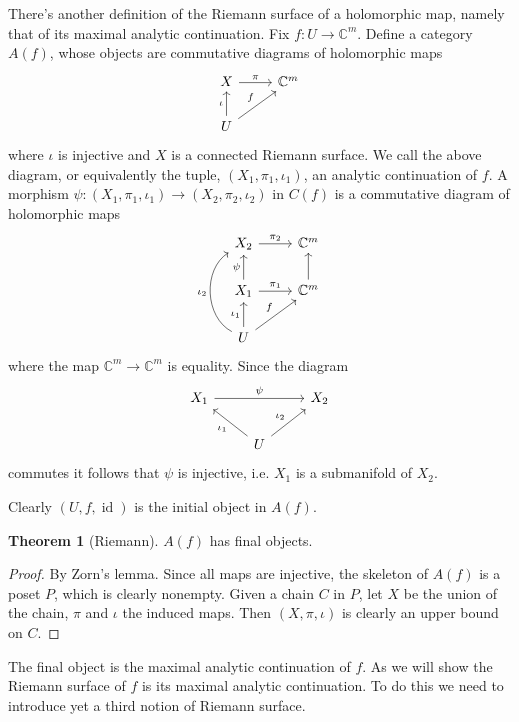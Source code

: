 \documentclass[12pt]{report}
\newcommand{\CC}{\mathbb{C}}
\DeclareMathOperator{\id}{id}
\theoremstyle{definition}
\newtheorem{theorem}{Theorem}[chapter]
\begin{document}
There's another definition of the Riemann surface of a holomorphic map, namely that of its maximal analytic continuation.
Fix $f: U \to \CC^m$.
Define a category $A(f)$, whose objects are commutative diagrams of holomorphic maps
$$\begin{tikzcd}
X \arrow[r,"\pi"] & \CC^m\\
U \arrow[u,"\iota"] \arrow[ur,"f"]
\end{tikzcd}$$
where $\iota$ is injective and $X$ is a connected Riemann surface.
We call the above diagram, or equivalently the tuple, $(X_1, \pi_1, \iota_1)$, an analytic continuation of $f$.
A morphism $\psi: (X_1, \pi_1, \iota_1) \to (X_2, \pi_2, \iota_2)$ in $C(f)$ is a commutative diagram of holomorphic maps
$$\begin{tikzcd}
X_2 \arrow[r,"\pi_2"] & \CC^m\\
X_1 \arrow[u,"\psi"] \arrow[r,"\pi_1"] & \CC^m \arrow[u]\\
U \arrow[u,"\iota_1"] \arrow[bend left=60,uu,"\iota_2"] \arrow[ur,"f"]
\end{tikzcd}$$
where the map $\CC^m \to \CC^m$ is equality.
Since the diagram
$$\begin{tikzcd}
X_1 \arrow[rr,"\psi"] && X_2\\
&U \arrow[ul,"\iota_1"] \arrow[ur,"\iota_2"]
\end{tikzcd}
$$
commutes it follows that $\psi$ is injective, i.e. $X_1$ is a submanifold of $X_2$.

Clearly $(U, f, \id)$ is the initial object in $A(f)$.
\begin{theorem}[Riemann]
$A(f)$ has final objects.
\end{theorem}
\begin{proof}
By Zorn's lemma. Since all maps are injective, the skeleton of $A(f)$ is a poset $P$, which is clearly nonempty.
Given a chain $C$ in $P$, let $X$ be the union of the chain, $\pi$ and $\iota$ the induced maps. Then $(X, \pi, \iota)$ is clearly an upper bound on $C$.
\end{proof}
The final object is the maximal analytic continuation of $f$. As we will show the Riemann surface of $f$ is its maximal analytic continuation.
To do this we need to introduce yet a third notion of Riemann surface.
\end{document}
